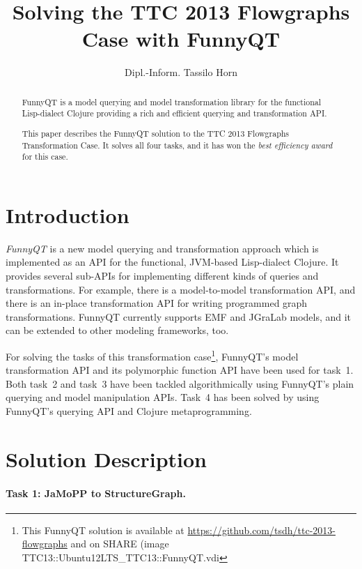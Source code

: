 \documentclass[submission]{eptcs}
\title{Solving the TTC 2013 Flowgraphs Case with FunnyQT}
\author{Dipl.-Inform. Tassilo Horn
  \email{horn@uni-koblenz.de}
  \institute{Institute for Software Technology, University Koblenz-Landau, Germany}}
\begin{document}
\maketitle

\begin{abstract}
  FunnyQT is a model querying and model transformation library for the
  functional Lisp-dialect Clojure providing a rich and efficient querying and
  transformation API.

  This paper describes the FunnyQT solution to the TTC 2013 Flowgraphs
  Transformation Case.  It solves all four tasks, and it has won the \emph{best
    efficiency award} for this case.
\end{abstract}

\section{Introduction}
\label{sec:introduction}

\emph{FunnyQT} is a new model querying and transformation approach which is
implemented as an API for the functional, JVM-based Lisp-dialect Clojure.  It
provides several sub-APIs for implementing different kinds of queries and
transformations.  For example, there is a model-to-model transformation API,
and there is an in-place transformation API for writing programmed graph
transformations.  FunnyQT currently supports EMF and JGraLab models, and it can
be extended to other modeling frameworks, too.

For solving the tasks of this transformation case\footnote{This FunnyQT
  solution is available at \url{https://github.com/tsdh/ttc-2013-flowgraphs}
  and on SHARE (image \textsf{TTC13::Ubuntu12LTS\_TTC13::FunnyQT.vdi}},
FunnyQT's model transformation API and its polymorphic function API have been
used for task~1.  Both task~2 and task~3 have been tackled algorithmically
using FunnyQT's plain querying and model manipulation APIs.  Task~4 has been
solved by using FunnyQT's querying API and Clojure metaprogramming.

\section{Solution Description}
\label{sec:solution-description}


\paragraph{Task 1: JaMoPP to StructureGraph.}
\label{sec:task-1}
\end{document}
